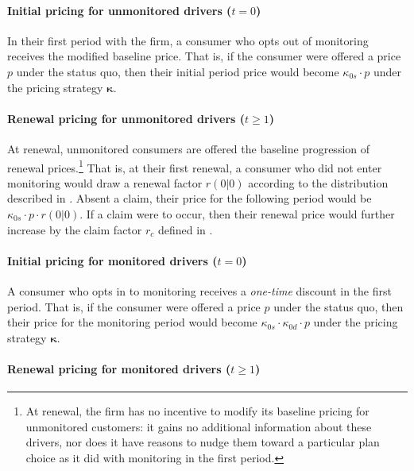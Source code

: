 \paragraph{Initial pricing for unmonitored drivers ($t = 0$)}
In their first period with the firm, a consumer who opts out of monitoring receives the modified baseline price. That is, if the consumer were offered a price $p$ under the status quo, then their initial period price would become $\kappa_{0s} \cdot p$ under the pricing strategy $\boldsymbol{\kappa}$.

\paragraph{Renewal pricing for unmonitored drivers ($t \geq 1$)}
At renewal, unmonitored consumers are offered the baseline progression of renewal prices.\footnote{At renewal, the firm has no incentive to modify its baseline pricing for unmonitored customers: it gains no additional information about these drivers, nor does it have reasons to nudge them toward a particular plan choice as it did with monitoring in the first period.} That is, at their first renewal, a consumer who did not enter monitoring would draw a renewal factor $r(0|0)$ according to the distribution described in . Absent a claim, their price for the following period would be $\kappa_{0s} \cdot p \cdot r(0|0)$. If a claim were to occur, then their renewal price would further increase by the claim factor $r_{c}$ defined in .

\paragraph{Initial pricing for monitored drivers ($t=0$)}

A consumer who opts in to monitoring receives a \textit{one-time} discount in the first period. That is, if the consumer were offered a price $p$ under the status quo, then their price for the monitoring period would become $\kappa_{0s} \cdot \kappa_{0d} \cdot p$ under the pricing strategy $\boldsymbol{\kappa}$.

\paragraph{Renewal pricing for monitored drivers ($t \geq 1$)}

